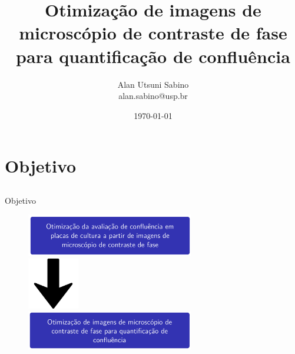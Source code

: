 \documentclass{beamer}
\title{Otimização de imagens de microscópio de contraste de fase
  para quantificação de confluência}
\author[Alan Sabino]{Alan Utsuni Sabino\\ {\tiny alan.sabino@usp.br}}
\institute[]
{
	\inst{}
	SIN5014 - Fundamentos de Processamento Gráfico \\
  Universidade de São Paulo
}
\date{\today}
\begin{document}
\label{Titulo}
{
  \begin{frame}
    \titlepage
  \end{frame}
}


\section{Objetivo}

\subsection{}
\begin{frame}{Objetivo}

  \begin{figure}
    \includegraphics[width=0.65\textwidth]{imgs/old_obj.png}\\
    \includegraphics[width=0.2\textwidth]{imgs/seta.png}\\
\includegraphics[width=0.65\textwidth]{imgs/new_obj.png}
    \end{figure}
\end{frame}
\end{document}

